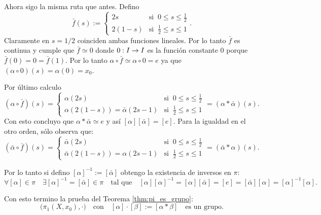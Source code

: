 \documentclass[../../topologia_algebraica]{subfiles}
\begin{document}
Ahora sigo la misma ruta que antes. Defino
\[
  \bar{f}(s):=
  \begin{cases}
    2s & \text{si}\;\; 0\leq s\leq\frac{1}{2}\\
    2(1-s) & \text{si}\;\; \frac{1}{2}\leq s\leq 1
  \end{cases}.  
\]
Claramente en $s=1/2$ coinciden ambas funciones lineales. Por lo tanto $\bar{f}$ es continua
y cumple que $\bar{f}\simeq 0$ donde $0:I\rightarrow I$ es la funci\'on constante $0$ porque
$\bar{f}(0)=0=\bar{f}(1)$. Por lo tanto $\alpha\circ\bar{f}\simeq \alpha\circ 0=e$ ya que
$(\alpha\circ0)(s)=\alpha(0)=x_0$.

Por \'ultimo calculo
\[
  (\alpha\circ \bar{f})(s)=
    \begin{cases}
      \alpha(2s) & \text{si}\;\; 0\leq s\leq \frac{1}{2} \\
      \alpha(2(1-s))=\bar{\alpha}(2s-1) & \text{si}\;\; \frac{1}{2}\leq s\leq 1
    \end{cases}
  =(\alpha*\bar{\alpha})(s).
\]
Con esto concluyo que $\alpha*\bar{\alpha}\simeq e$ y as\'i $[\alpha][\bar{\alpha}]=[e]$.
Para la igualdad en el otro orden, s\'olo observa que:
\[
  (\bar{\alpha}\circ \bar{f})(s)=
    \begin{cases}
      \bar{\alpha}(2s) & \text{si}\;\; 0\leq s\leq \frac{1}{2} \\
      \bar{\alpha}(2(1-s))=\alpha(2s-1) & \text{si}\;\; \frac{1}{2}\leq s\leq 1
    \end{cases}
  =(\bar{\alpha}*\alpha)(s).
\]

Por lo tanto si defino $[\alpha]^{-1}:=[\bar{\alpha}]$ obtengo la existencia de inversos en $\pi$:
\begin{equation}
  \label{eq:existencia_inversos}
  \forall [\alpha]\in\pi \quad \exists[\alpha]^{-1}=[\bar{\alpha}]\in\pi \quad\text{tal que}\quad
  [\alpha][\alpha]^{-1}=[\alpha][\bar{\alpha}]=[e]=[\bar{\alpha}][\alpha]=[\alpha]^{-1}[\alpha].
\end{equation}

Con esto termino la prueba del Teorema \ref{thm:pi_es_grupo}:
\[
  \big(\pi_1(X,x_0),\cdot\big) \quad\text{con}\quad [\alpha]\cdot[\beta]:=[\alpha*\beta]
  \quad\text{es un grupo}.
\]
\end{document}
